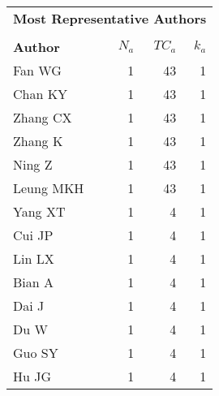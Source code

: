 \documentclass[a4paper,11pt]{report}
\begin{document}
\begin{landscape}
\begin{table}[!ht]
{\begin{tabular}{|l r r r|}
\hline
\hline
\multicolumn{4}{|c|}{{\bf Most Representative Authors}}\\
&&&\\
{\bf Author} & {\bf $N_a$} & {\bf $TC_a$} & {\bf $k_a$}\\
Fan WG & 1 & 43 & 1 \\
Chan KY & 1 & 43 & 1 \\
Zhang CX & 1 & 43 & 1 \\
Zhang K & 1 & 43 & 1 \\
Ning Z & 1 & 43 & 1 \\
Leung MKH & 1 & 43 & 1 \\
Yang XT & 1 & 4 & 1 \\
Cui JP & 1 & 4 & 1 \\
Lin LX & 1 & 4 & 1 \\
Bian A & 1 & 4 & 1 \\
Dai J & 1 & 4 & 1 \\
Du W & 1 & 4 & 1 \\
Guo SY & 1 & 4 & 1 \\
Hu JG & 1 & 4 & 1 \\
\hline
\end{tabular}
}
\end{table}

\end{landscape}
\end{document}
